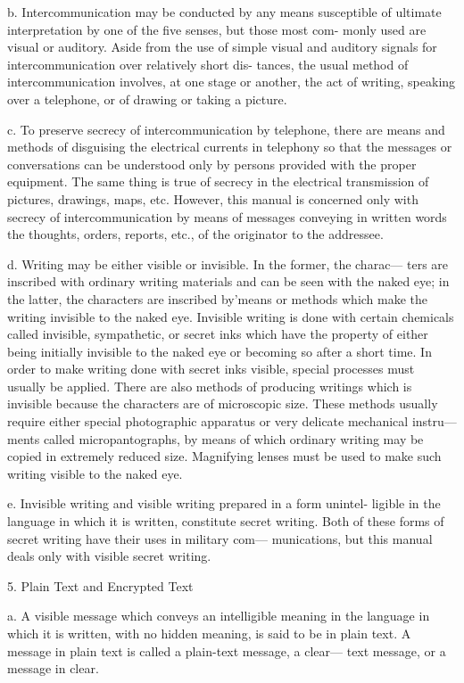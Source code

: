 b. Intercommunication may be conducted by any means susceptible of
ultimate interpretation by one of the ﬁve senses, but those most com-
monly used are visual or auditory. Aside from the use of simple visual
and auditory signals for intercommunication over relatively short dis-
tances, the usual method of intercommunication involves, at one stage
or another, the act of writing, speaking over a telephone, or of drawing
or taking a picture.

c. To preserve secrecy of intercommunication by telephone, there are
means and methods of disguising the electrical currents in telephony so
that the messages or conversations can be understood only by persons
provided with the proper equipment. The same thing is true of secrecy
in the electrical transmission of pictures, drawings, maps, etc. However,
this manual is concerned only with secrecy of intercommunication by
means of messages conveying in written words the thoughts, orders,
reports, etc., of the originator to the addressee.

d. Writing may be either visible or invisible. In the former, the charac—
ters are inscribed with ordinary writing materials and can be seen with
the naked eye; in the latter, the characters are inscribed by'means or
methods which make the writing invisible to the naked eye. Invisible
writing is done with certain chemicals called invisible, sympathetic, or
secret inks which have the property of either being initially invisible to
the naked eye or becoming so after a short time. In order to make writing
done with secret inks visible, special processes must usually be applied.
There are also methods of producing writings which is invisible because
the characters are of microscopic size. These methods usually require
either special photographic apparatus or very delicate mechanical instru—
ments called micropantographs, by means of which ordinary writing may
be copied in extremely reduced size. Magnifying lenses must be used to
make such writing visible to the naked eye.

e. Invisible writing and visible writing prepared in a form unintel-
ligible in the language in which it is written, constitute secret writing.
Both of these forms of secret writing have their uses in military com—
munications, but this manual deals only with visible secret writing.

5. Plain Text and Encrypted Text

a. A visible message which conveys an intelligible meaning in the
language in which it is written, with no hidden meaning, is said to be in
plain text. A message in plain text is called a plain-text message, a clear—
text message, or a message in clear.

